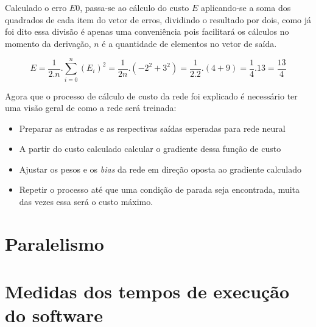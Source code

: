 \begin{apendicesenv}
	\par Calculado o erro $E0$, passa-se ao cálculo do custo $E$ aplicando-se a soma dos quadrados de cada item do vetor de erros, dividindo o resultado por dois, como já foi dito essa divisão é apenas uma conveniência pois facilitará os cálculos no momento da derivação, $n$ é a quantidade de elementos no vetor de saída.
	
	\begin{equation}\label{eq:averageQuadError}
		E = \dfrac{1}{2.n}. \sum_{i=0}^{n}  (E_i)^2 = \dfrac{1}{2n} . (-2^2 + 3^2)  = \dfrac{1}{2.2} . (4 + 9) = \dfrac{1}{4} . 13 = \dfrac{13}{4} 
	\end{equation}


	\par Agora que o processo de cálculo de custo da rede foi explicado é necessário ter uma visão geral de como a rede será treinada:
	
	\begin{itemize}
		\item Preparar as entradas e as respectivas saídas esperadas para rede neural
		\item A partir do custo calculado calcular o gradiente dessa função de custo
		\item Ajustar os pesos e os \textit{bias} da rede em direção oposta ao gradiente calculado
		\item Repetir o processo até que uma condição de parada seja encontrada, muita das vezes essa será o custo máximo.
	\end{itemize}
		

	\chapter{Paralelismo}
		\par 
		
		\chapter{Medidas dos tempos de execução do software}
		
		
\end{apendicesenv}









